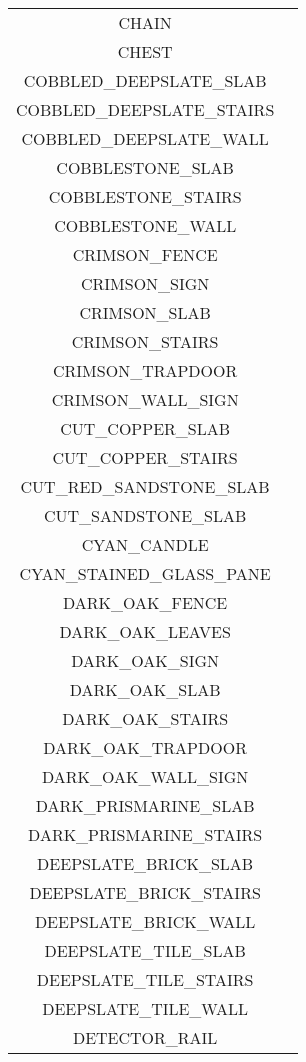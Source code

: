 \begin{longtable}{ |c|c| }
	CHAIN & \xmark \\
	CHEST & \xmark \\
	COBBLED\_DEEPSLATE\_SLAB & \xmark \\
	COBBLED\_DEEPSLATE\_STAIRS & \xmark \\
	COBBLED\_DEEPSLATE\_WALL & \xmark \\
	COBBLESTONE\_SLAB & \xmark \\
	COBBLESTONE\_STAIRS & \xmark \\
	COBBLESTONE\_WALL & \xmark \\
	CRIMSON\_FENCE & \xmark \\
	CRIMSON\_SIGN & \xmark \\
	CRIMSON\_SLAB & \xmark \\
	CRIMSON\_STAIRS & \xmark \\
	CRIMSON\_TRAPDOOR & \xmark \\
	CRIMSON\_WALL\_SIGN & \xmark \\
	CUT\_COPPER\_SLAB & \xmark \\
	CUT\_COPPER\_STAIRS & \xmark \\
	CUT\_RED\_SANDSTONE\_SLAB & \xmark \\
	CUT\_SANDSTONE\_SLAB & \xmark \\
	CYAN\_CANDLE & \xmark \\
	CYAN\_STAINED\_GLASS\_PANE & \xmark \\
	DARK\_OAK\_FENCE & \xmark \\
	DARK\_OAK\_LEAVES & \xmark \\
	DARK\_OAK\_SIGN & \xmark \\
	DARK\_OAK\_SLAB & \xmark \\
	DARK\_OAK\_STAIRS & \xmark \\
	DARK\_OAK\_TRAPDOOR & \xmark \\
	DARK\_OAK\_WALL\_SIGN & \xmark \\
	DARK\_PRISMARINE\_SLAB & \xmark \\
	DARK\_PRISMARINE\_STAIRS & \xmark \\
	DEEPSLATE\_BRICK\_SLAB & \xmark \\
	DEEPSLATE\_BRICK\_STAIRS & \xmark \\
	DEEPSLATE\_BRICK\_WALL & \xmark \\
	DEEPSLATE\_TILE\_SLAB & \xmark \\
	DEEPSLATE\_TILE\_STAIRS & \xmark \\
	DEEPSLATE\_TILE\_WALL & \xmark \\
	DETECTOR\_RAIL & \xmark \\

\end{longtable}
